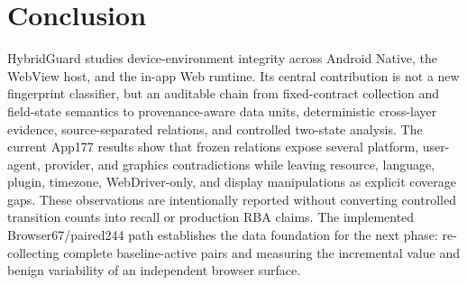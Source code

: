 \section{Conclusion}
\label{sec:conclusion}

HybridGuard studies device-environment integrity across Android Native, the WebView host, and the in-app Web runtime. Its central contribution is not a new fingerprint classifier, but an auditable chain from fixed-contract collection and field-state semantics to provenance-aware data units, deterministic cross-layer evidence, source-separated relations, and controlled two-state analysis. The current App177 results show that frozen relations expose several platform, user-agent, provider, and graphics contradictions while leaving resource, language, plugin, timezone, WebDriver-only, and display manipulations as explicit coverage gaps. These observations are intentionally reported without converting controlled transition counts into recall or production RBA claims. The implemented Browser67/paired244 path establishes the data foundation for the next phase: re-collecting complete baseline-active pairs and measuring the incremental value and benign variability of an independent browser surface.
